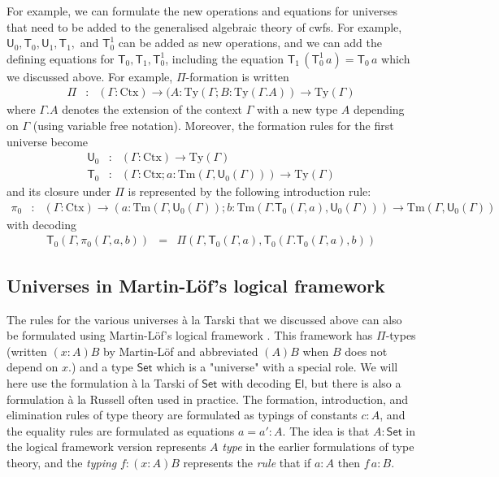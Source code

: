 \documentclass[11pt,a4paper]{article}
\def\UU{\mathsf{U}}
\newcommand{\Set}{\mathsf{Set}}
\newcommand{\El}{\mathsf{El}}
\newcommand{\T}{\mathsf{T}}
\def\Ctx{\mathrm{Ctx}}
\def\Ty{\mathrm{Ty}}
\def\Tm{\mathrm{Tm}}
\begin{document}
For example, we can formulate the new operations and equations for universes that need to be added to the generalised algebraic theory of cwfs. For example, $\UU_0,\T_0,\UU_1, \T_1,$ and $\T_0^1$ can be added as new operations, and we can add the defining equations for $\T_0, \T_1,\T_0^1$, including the equation
$
\T_1\, (\T_0^1\, a) = \T_0\, a
$
which we discussed above.
For example, $\Pi$-formation is written 
\begin{eqnarray*}
\Pi&: &(\Gamma : \Ctx) \to (A : \Ty(\Gamma; B : \Ty(\Gamma.A)) \to\Ty(\Gamma)
\end{eqnarray*}
where $\Gamma.A$ denotes the extension of the context $\Gamma$ with a new type $A$ depending on $\Gamma$ (using variable free notation). Moreover, the formation rules for the first universe become
\begin{eqnarray*}
\UU_0 &: &(\Gamma : \Ctx) \to \Ty(\Gamma)\\
\T_0 &: &(\Gamma : \Ctx ; a : \Tm(\Gamma,\UU_0(\Gamma)))\to \Ty(\Gamma)
\end{eqnarray*}
and its closure under $\Pi$ is represented by the following introduction rule:
\begin{eqnarray*}
\pi_0&: &(\Gamma : \Ctx) \to (a : \Tm(\Gamma,\UU_0(\Gamma)); b : \Tm(\Gamma.\T_0(\Gamma,a),\UU_0(\Gamma))) \to\Tm(\Gamma,\UU_0(\Gamma))
\end{eqnarray*}
with decoding
\begin{eqnarray*}
\T_0(\Gamma,\pi_0(\Gamma,a,b)) &=& \Pi(\Gamma,\T_0(\Gamma,a), \T_0(\Gamma.\T_0(\Gamma,a),b))
\end{eqnarray*}

\subsection{Universes in Martin-Löf's logical framework}

The rules for the various universes \`a la Tarski that we discussed above can also be formulated using Martin-Löf's logical framework \cite{Martinlof86,NordstromPS90}. This framework has $\Pi$-types (written $(x : A)B$ by Martin-Löf and abbreviated $(A)B$ when $B$ does not depend on $x$.) and a type $\Set$ which is a "universe" with a special role. We will here use the formulation \`a la Tarski of $\Set$ with decoding $\El$, but there is also a formulation \`a la Russell often used in practice. The formation, introduction, and elimination rules of type theory are formulated as typings of constants $c : A$, and the equality rules are formulated as equations $a = a' : A$. The idea is that $A : \Set$ in the logical framework version represents $A$ {\em type} in the earlier formulations of type theory, and the {\em typing} $f : (x : A)B$ represents the {\em rule} that if $a : A$ then $f\,a : B$.
\end{document}
